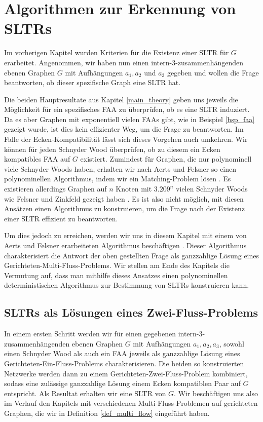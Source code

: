 \chapter{Algorithmen zur Erkennung von SLTRs}\label{main_algo}

Im vorherigen Kapitel wurden Kriterien für die Existenz einer SLTR für $G$ erarbeitet. Angenommen, wir haben nun einen intern-3-zusammenhängenden ebenen Graphen $G$ mit Aufhängungen $a_1,a_2$ und $a_3$ gegeben und wollen die Frage beantworten, ob dieser spezifische Graph eine SLTR hat.

Die beiden Hauptresultate aus Kapitel \ref{main_theory} geben uns jeweils die Möglichkeit für ein spezifisches FAA zu überprüfen, ob es eine SLTR induziert. Da es aber Graphen mit exponentiell vielen FAAs gibt, wie in Beispiel \ref{bsp_faa} gezeigt wurde, ist dies kein effizienter Weg, um die Frage zu beantworten. Im Falle der Ecken-Kompatibilität lässt sich dieses Vorgehen auch umkehren. Wir können für jeden Schnyder Wood überprüfen, ob zu diesem ein Ecken kompatibles FAA auf $G$ existiert. Zumindest für Graphen, die nur polynominell viele Schnyder Woods haben, erhalten wir nach Aerts und Felsner so einen polynominellen Algorithmus, indem wir ein Matching-Problem lösen \cite{af15}. Es existieren allerdings Graphen auf $n$ Knoten mit $3.209^n$ vielen Schnyder Woods wie Felsner und Zinkfeld gezeigt haben \cite{fz08}. Es ist also nicht möglich, mit diesen Ansätzen einen Algorithmus zu konstruieren, um die Frage nach der Existenz einer SLTR effizient zu beantworten.

Um dies jedoch zu erreichen, werden wir uns in diesem Kapitel mit einem von Aerts und Felsner erarbeiteten Algorithmus beschäftigen \cite{af15}. Dieser Algorithmus charakterisiert die Antwort der oben gestellten Frage als ganzzahlige Lösung eines Gerichteten-Multi-Fluss-Problems. Wir stellen am Ende des Kapitels die Vermutung auf, dass man mithilfe dieses Ansatzes einen polynominellen deterministischen Algorithmus zur Bestimmung von SLTRs konstruieren kann.

\section{SLTRs als Lösungen eines Zwei-Fluss-Problems}

In einem ersten Schritt werden wir für einen gegebenen intern-3-zusammenhängenden ebenen Graphen $G$ mit Aufhängungen $a_1,a_2,a_3$, sowohl einen Schnyder Wood als auch ein FAA jeweils als ganzzahlige Lösung eines Gerichteten-Ein-Fluss-Problems charakterisieren. Die beiden so konstruierten Netzwerke werden dann zu einem Gerichteten-Zwei-Fluss-Problem kombiniert, sodass eine zulässige ganzzahlige Lösung einem Ecken kompatiblen Paar auf $G$ entspricht. Als Resultat erhalten wir eine SLTR von $G$. Wir beschäftigen uns also im Verlauf den Kapitels mit verschiedenen Multi-Fluss-Problemen auf gerichteten Graphen, die wir in Definition \ref{def_multi_flow} eingeführt haben.

